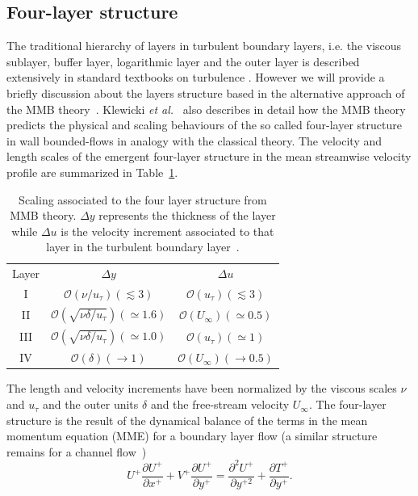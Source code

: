 \documentclass[aps,reprint,amsmath,amssymb,pra]{revtex4-1}%
\begin{document}
\subsection{Four-layer structure\label{subsec:4ls}}
The traditional hierarchy of layers in turbulent boundary layers, i.e. the viscous sublayer, buffer layer, logarithmic layer and the outer layer is described extensively in standard textbooks on turbulence \cite{tenelumley,pa,mathieu}. However we will provide a briefly discussion about the layers structure based in the alternative approach of the MMB theory~\citep{wei2005,fife2005}. Klewicki \textit{et al.}~\citep{Klewickimmb} also describes in detail how the MMB theory predicts the physical and scaling behaviours of the so called four-layer structure in wall bounded-flows in analogy with the classical theory.  The velocity and  length scales of the emergent four-layer structure in the mean streamwise velocity profile are summarized in Table~\ref{tab:4layerstructure}.

\begin{table}[htb]%
\caption{\label{tab:4layerstructure}%
Scaling associated to the four layer structure from MMB theory. $\Delta y$ represents the thickness of the layer while $\Delta u$ is the velocity increment associated to that layer in the turbulent boundary layer~\citep{Klewickimmb}.
}
\begin{ruledtabular}
\begin{tabular}{ccc}
\textrm{Layer}&
\textrm{$\Delta y$}&
\textrm{$\Delta u$}\\
\colrule
I &$\mathcal{O}(\nu/u_{\tau})(\lesssim 3)$&$\mathcal{O}(u_{\tau})(\lesssim 3)$\\
II &$\mathcal{O}(\sqrt{\nu\delta/u_{\tau}})(\simeq 1.6)$&$\mathcal{O}(U_{\infty})(\simeq 0.5)$\\
III &$\mathcal{O}(\sqrt{\nu\delta/u_{\tau}})(\simeq 1.0)$&$\mathcal{O}(u_{\tau})(\simeq 1)$\\
IV &$\mathcal{O}(\delta)(\rightarrow 1)$&$\mathcal{O}(U_{\infty})(\rightarrow 0.5)$ \\
\end{tabular}
\end{ruledtabular}
\end{table}
The length and velocity increments have been normalized by the viscous scales $\nu$ and $u_{\tau}$ and the outer units $\delta$ and the free-stream velocity $U_{\infty}$. The four-layer structure is the result of the dynamical balance of the terms in the mean momentum equation  (MME) for a boundary layer flow (a similar structure remains for a channel flow~\citep{Klewickimmb})
\begin{equation}\label{eq:mme}
U^+\frac{\partial U^+}{\partial x^+}+ V^+ \frac{\partial U^+}{\partial y^+}=
\frac{\partial^2 U^+}{\partial y^{+2}}+\frac{\partial T^+}{\partial y^+}.
\end{equation}
\end{document}
